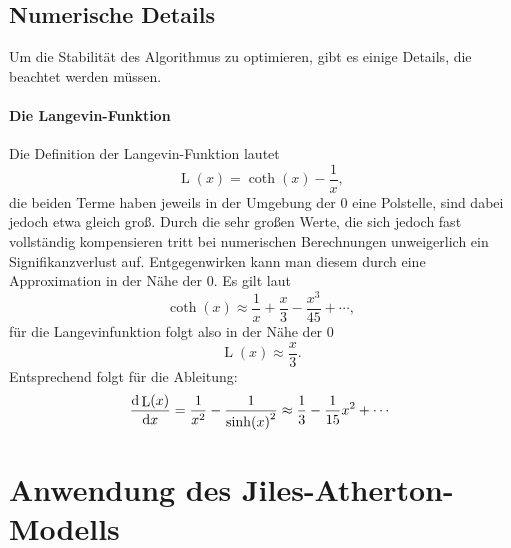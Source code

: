 \documentclass{scrartcl}
\DeclareMathOperator{\Langevin}{L}
\begin{document}
\subsection{Numerische Details}
Um die Stabilität des Algorithmus zu optimieren, gibt es einige Details, die beachtet werden müssen.
\paragraph{Die Langevin-Funktion}
Die Definition der Langevin-Funktion lautet
\begin{equation}
	\Langevin(x) = \coth(x) - \frac{1}{x},
\end{equation}
die beiden Terme haben jeweils in der Umgebung der $0$ eine Polstelle, sind dabei jedoch etwa gleich groß. Durch die sehr großen Werte, die sich jedoch fast vollständig kompensieren tritt bei numerischen Berechnungen unweigerlich ein Signifikanzverlust auf. Entgegenwirken kann man diesem durch eine Approximation in der Nähe der $0$. Es gilt laut \cite{abramowitz}
\begin{equation}
	\coth(x) \approx \frac{1}{x} + \frac{x}{3} - \frac{x^3}{45} + \cdots,
\end{equation}
für die Langevinfunktion folgt also in der Nähe der $0$
\begin{equation}
	\Langevin(x) \approx \frac{x}{3}.
\end{equation}
Entsprechend folgt für die Ableitung:
\begin{equation}
	\frac{\dif \Langevin(x)}{\dif x} = \frac{1}{x^2} - \frac{1}{\sinh(x)^2} \approx \frac{1}{3} - \frac{1}{15}x^2 + \cdots
\end{equation}
\section{Anwendung des Jiles-Atherton-Modells}

\newpage
\printbibliography
\end{document}
